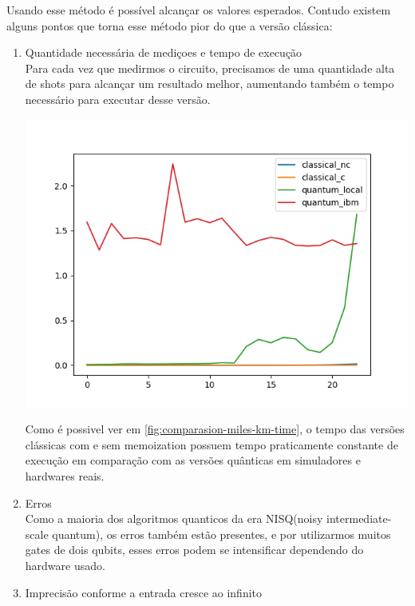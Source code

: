 \documentclass{article}
\begin{document}
Usando esse método é possível alcançar os valores esperados. Contudo existem alguns pontos que torna esse método pior do que a versão clássica:

\begin{enumerate}
\item{Quantidade necessária de mediçoes e tempo de execução}\\
Para cada vez que medirmos o circuito, precisamos de uma quantidade alta de shots para alcançar um resultado melhor, aumentando também o tempo necessário para executar desse versão.

\begin{center}
	\includegraphics[scale=0.6]{comparison_miles_to_km.png}
	\label{fig:comparasion-miles-km-time}
\end{center}

Como é possivel ver em \ref{fig:comparasion-miles-km-time}, o tempo das versões clássicas com e sem memoization possuem tempo praticamente constante de execução em comparação com as versões quânticas em simuladores e hardwares reais.


\item{Erros}\\
Como a maioria dos algoritmos quanticos da era NISQ(noisy intermediate-scale quantum), os erros também estão presentes, e por utilizarmos muitos gates de dois qubits, esses erros podem se intensificar dependendo do hardware usado.

\item{Imprecisão conforme a entrada cresce ao infinito}\\


\end{enumerate}
\end{document}

